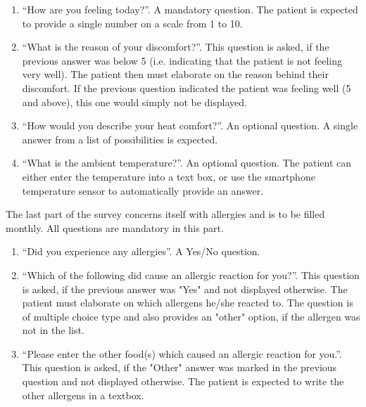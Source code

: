 \begin{enumerate}
\item ``How are you feeling today?''. A mandatory question. The patient is expected to provide a single number on a scale from 1 to 10.
\item ``What is the reason of your discomfort?''. This question is asked, if the previous answer was below 5 (i.e. indicating that the patient is not feeling very well). The patient then must elaborate on the reason behind their discomfort. If the previous question indicated the patient was feeling well (5 and above), this one would simply not be displayed.
\item ``How would you describe your heat comfort?''. An optional question. A single answer from a list of possibilities is expected.
\item ``What is the ambient temperature?''. An optional question. The patient can either enter the temperature into a text box, or use the smartphone temperature sensor to automatically provide an answer.
\end{enumerate}

The last part of the survey concerns itself with allergies and is to be filled monthly. All questions are mandatory in this part.

\begin{enumerate}
\item ``Did you experience any allergies''. A Yes/No question.
\item ``Which of the following did cause an allergic reaction for you?''. This question is asked, if the previous answer was "Yes" and not displayed otherwise. The patient must elaborate on which allergens he/she reacted to. The question is of multiple choice type and also provides an "other" option, if the allergen was not in the list.
\item ``Please enter the other food(s) which caused an allergic reaction for you.''. This question is asked, if the "Other" answer was marked in the previous question and not displayed otherwise. The patient is expected to write the other allergens in a textbox.
\end{enumerate}

